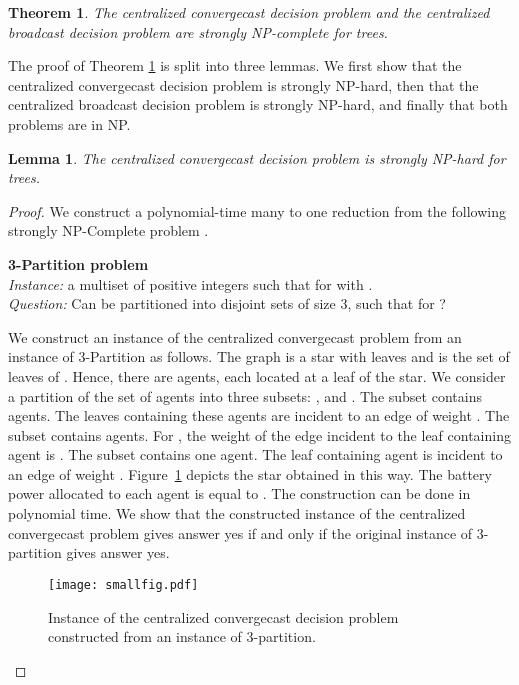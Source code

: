\documentclass{article}
\newtheorem{lemma}{Lemma}
\newtheorem{theorem}{Theorem}
\newcommand{\probleme}[3]{\medskip\noindent\textbf{#1 problem}\\ \noindent \emph{Instance: }#2\\ \noindent \emph{Question: }#3\medskip}
\newcommand\cccast{centralized convergecast\xspace}
\begin{document}
\begin{theorem}\label{th:NP-graph}
The {\cccast} decision problem and the centralized broadcast decision problem are strongly NP-complete for trees.  
\end{theorem}

The proof of Theorem \ref{th:NP-graph} is split into three lemmas. We first show that the {\cccast} decision problem is strongly NP-hard, then that the centralized broadcast decision problem is strongly NP-hard, and finally that both problems are in NP.

\begin{lemma}\label{th:NP-hard-graph}
The {\cccast} decision problem is strongly NP-hard for trees.  
\end{lemma}

\begin{proof}
We construct a polynomial-time many to one reduction from the following strongly NP-Complete problem \cite{GJ79}.

\probleme{3-Partition}{a multiset  of  positive integers 
  such that for  with
  .}{Can  be partitioned into 
  disjoint sets  of size 3, such that  for
   ?}

We construct an instance  of the {\cccast} problem from an instance of 3-Partition as follows. The graph  is a star with  leaves and  is the set of leaves of . Hence, there are  agents, each located at a leaf of the star.
We consider a partition of the set of agents into three subsets: ,  and . The subset  contains  agents. The leaves containing these agents are incident to an edge of weight . The subset  contains  agents. For  , the weight of the edge incident to the leaf containing agent  is . The subset  contains one agent. The leaf containing agent  is incident to an edge of weight . Figure~\ref{fig:reduc} depicts the star obtained in this way. The battery power  allocated to each agent is equal to . The construction can be done in polynomial time. We show that the constructed instance of the {\cccast} problem gives answer yes if and only if the original instance of 3-partition gives answer yes.

\begin{figure}[h]
\centering
\texttt{[image: smallfig.pdf]}
\caption{Instance of the {\cccast} decision problem constructed from an instance of 3-partition.}
\label{fig:reduc}
\end{figure}


\end{proof}
\end{document}
